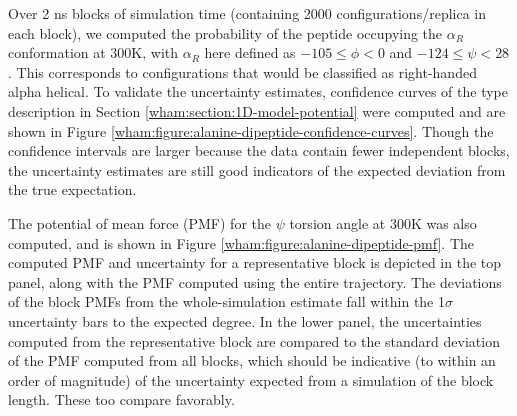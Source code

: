 Over 2 ns blocks of simulation time (containing 2000 configurations/replica in each block), we computed the probability of the peptide occupying the $\alpha_R$ conformation at 300K, with $\alpha_R$ here defined as $-105 \le \phi < 0$ and $-124 \le \psi < 28$.  This corresponds to configurations that would be classified as right-handed alpha helical.  To validate the uncertainty estimates, confidence curves of the type description in Section \ref{wham:section:1D-model-potential} were computed and are shown in Figure \ref{wham:figure:alanine-dipeptide-confidence-curves}.  Though the confidence intervals are larger because the data contain fewer independent blocks, the uncertainty estimates are still good indicators of the expected deviation from the true expectation.

The potential of mean force (PMF) for the $\psi$ torsion angle at 300K was also computed, and is shown in Figure \ref{wham:figure:alanine-dipeptide-pmf}.  The computed PMF and uncertainty for a representative block is depicted in the top panel, along with the PMF computed using the entire trajectory.  The deviations of the block PMFs from the whole-simulation estimate fall within the 1$\sigma$ uncertainty bars to the expected degree.  In the lower panel, the uncertainties computed from the representative block are compared to the standard deviation of the PMF computed from all blocks, which should be indicative (to within an order of magnitude) of the uncertainty expected from a simulation of the block length.  These too compare favorably.

